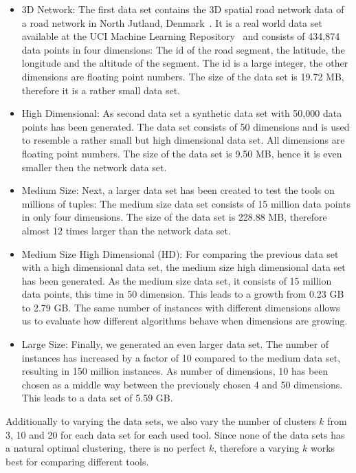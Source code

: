 \begin{itemize} 
\item 3D Network: The first data set contains the 3D spatial road network data of a road network in North Jutland, Denmark~\parencite{3dnet}. It is a real world data set available at the UCI Machine Learning Repository~\parencite{frank2010uci} and consists of 434,874 data points in four dimensions: The id of the road segment, the latitude, the longitude and the altitude of the segment. The id is a large integer, the other dimensions are floating point numbers. The size of the data set is 19.72 MB, therefore it is a rather small data set.

\item High Dimensional: As second data set a synthetic data set with 50,000 data points has been generated. The data set consists of 50 dimensions and is used to resemble a rather small but high dimensional data set. All dimensions are floating point numbers. The size of the data set is 9.50 MB, hence it is even smaller then the network data set.

\item Medium Size: Next, a larger data set has been created to test the tools on millions of tuples: The medium size data set consists of 15 million data points in only four dimensions. The size of the data set is 228.88 MB, therefore almost 12 times larger than the network data set.

\item Medium Size High Dimensional (HD): For comparing the previous data set with a high dimensional data set, the medium size high dimensional data set has been generated. As the medium size data set, it consists of 15 million data points, this time in 50 dimension. This leads to a growth from 0.23 GB to 2.79 GB. The same number of instances with different dimensions allows us to evaluate how different algorithms behave when dimensions are growing.

\item Large Size: Finally, we generated an even larger data set. The number of instances has increased by a factor of 10 compared to the medium data set, resulting in 150 million instances. As number of dimensions, 10 has been chosen as a middle way between the previously chosen 4 and 50 dimensions. This leads to a data set of 5.59 GB.
\end{itemize} 

Additionally to varying the data sets, we also vary the number of clusters $k$ from 3, 10 and 20 for each data set for each used tool. Since none of the data sets has a natural optimal clustering, there is no perfect $k$, therefore a varying $k$ works best for comparing different tools.



